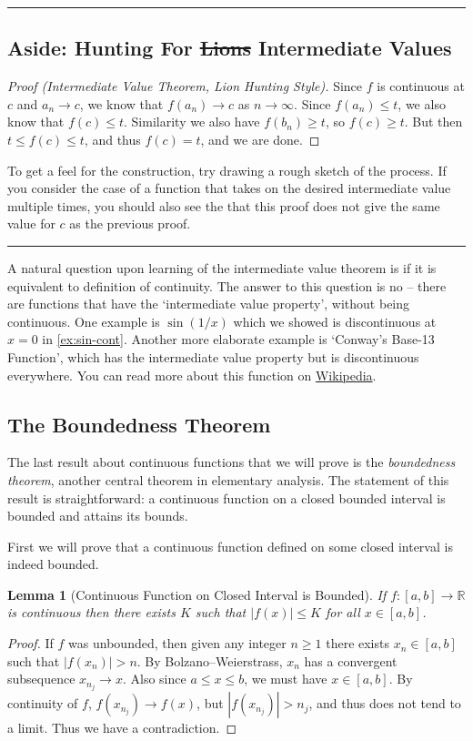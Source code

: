 \documentclass[11pt, a4paper]{article}
\newtheorem{lemma}[theorem]{Lemma}
\theoremstyle{definition}
\newenvironment{aside}[1]{
	\noindent
    \rule{\textwidth}{0.025cm}
    \vspace{-1.75\baselineskip}
    \subsection*{#1}}
{\noindent\rule{\textwidth}{0.025cm}}
\newcommand{\R}{\mathbb{R}}
\begin{document}
\begin{aside}{Aside: Hunting For \st{Lions} Intermediate Values}
\begin{proof}[Proof (Intermediate Value Theorem, Lion Hunting Style)]
Since $f$ is continuous at $c$ and $a_n \rightarrow c$, we know that $f(a_n) \rightarrow c$ as $n \rightarrow \infty$. Since $f(a_n) \leq t$, we also know that $f(c) \leq t$. Similarity we also have $f(b_n) \geq t$, so $f(c) \geq t$. But then $t \leq f(c) \leq t$, and thus $f(c) = t$, and we are done.
	\end{proof}

	To get a feel for the construction, try drawing a rough sketch of the process. If you consider the case of a function that takes on the desired intermediate value multiple times, you should also see the that this proof does not give the same value for $c$ as the previous proof.

\end{aside}


A natural question upon learning of the intermediate value theorem is if it is equivalent to definition of continuity. The answer to this question is no -- there are functions that have the `intermediate value property', without being continuous. One example is $\sin(1/x)$ which we showed is discontinuous at $x = 0$ in \autoref{ex:sin-cont}. Another more elaborate example is `Conway's Base-13 Function', which has the intermediate value property but is discontinuous everywhere. You can read more about this function on \href{https://en.wikipedia.org/wiki/Conway_base_13_function}{Wikipedia}.


\subsection{The Boundedness Theorem}

The last result about continuous functions that we will prove is the \emph{boundedness theorem}, another central theorem in elementary analysis. The statement of this result is straightforward: a continuous function on a closed bounded interval is bounded and attains its bounds.

First we will prove that a continuous function defined on some closed interval is indeed bounded.
\begin{lemma}[Continuous Function on Closed Interval is Bounded]
	If $f:[a, b] \rightarrow \R$ is continuous then there exists $K$ such that $|f(x)| \leq K$ for all $x \in [a, b]$.
\end{lemma}
\begin{proof}
If $f$ was unbounded, then given any integer $n \geq 1$ there exists $x_n \in [a, b]$ such that $|f(x_n)| > n$. By Bolzano–Weierstrass, $x_n$ has a convergent subsequence $x_{n_j} \rightarrow x$. Also since $a \leq x \leq b$, we must have $x \in [a, b]$.
By continuity of $f$, $f(x_{n_j}) \rightarrow f(x)$, but $|f(x_{n_j})| > n_j$, and thus does not tend to a limit. Thus we have a contradiction.
\end{proof}
\end{document}
